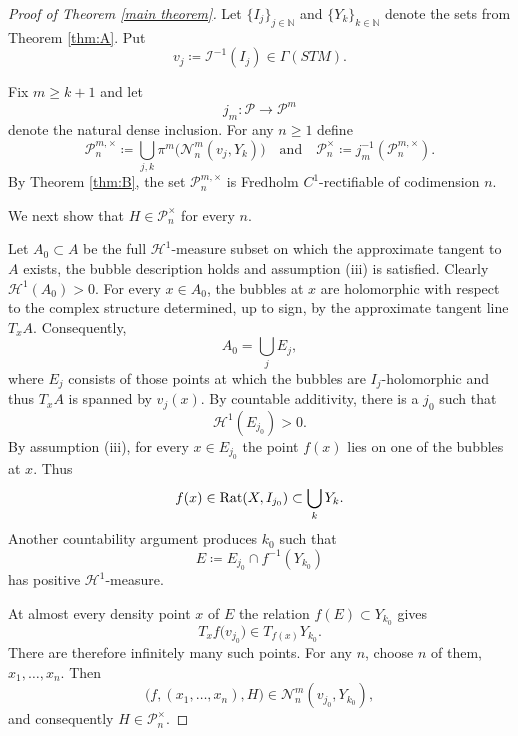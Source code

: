 \documentclass[11pt,a4paper]{article}
\theoremstyle{definition}
\newcommand{\Rat}{\textnormal{Rat}}
\newcommand{\eand}{\quad \text{and} \quad}
\newcommand{\cH}{\mathcal{H}}
\newcommand{\cI}{\mathcal{I}}
\newcommand{\cP}{\mathcal{P}}
\newcommand{\cN}{\mathcal{N}}
\newcommand{\bN}{\mathbb{N}}
\begin{document}
\begin{proof}[Proof of Theorem \ref{main theorem}]

Let $\{ I_j \}_{j \in \bN}$ and $\{ Y_k \}_{k \in \bN}$ denote the sets from Theorem \ref{thm:A}. Put 
\begin{equation*}
    v_j \coloneq \cI^{-1}(I_j) \in \Gamma(STM).
\end{equation*} 

Fix $m \geq k+1$ and let
\begin{equation*}
    j_m: \cP \to \cP^m
\end{equation*}
denote the natural dense inclusion. For any $n \geq 1$ define 
\begin{equation*}
    \cP^{m, \times}_n \coloneq \bigcup_{j,k} \pi^m\big(\cN^m_n (v_j, Y_k) \big) \eand \cP^\times_n \coloneq j^{-1}_m (\cP^{m, \times}_n ).
\end{equation*} 
By Theorem \ref{thm:B}, the set $\cP^{m, \times}_n$ is Fredholm $C^1$-rectifiable of codimension $n$.

We next show that $H \in \cP^\times_n$ for every $n$.

Let $A_0 \subset A$ be the full $\cH^1$-measure subset on which the approximate tangent to $A$ exists, the bubble description holds and assumption (iii) is satisfied. Clearly $\cH^1(A_0)>0$. For every $x \in A_0$, the bubbles at $x$ are holomorphic with respect to the complex structure determined, up to sign, by the approximate tangent line $T_x A$. Consequently,
\begin{equation*}
    A_0 = \bigcup_j E_j,
\end{equation*}
where $E_j$ consists of those points at which the bubbles are $I_j$-holomorphic and thus $T_x A$ is spanned by $v_j(x)$. By countable additivity, there is a $j_0$ such that 
\begin{equation*}
    \cH^1(E_{j_0}) >0.
\end{equation*}
By assumption (iii), for every $x \in E_{j_0}$ the point $f(x)$ lies on one of the bubbles at $x$. Thus 
\begin{equation*}
    f(x) \in \Rat(X, I_{j_0}) \subset \bigcup_k Y_k.
\end{equation*}
Another countability argument produces $k_0$ such that
\begin{equation*}
    E \coloneq E_{j_0} \cap f^{-1}(Y_{k_0})
\end{equation*}
has positive $\cH^1$-measure. 

At almost every density point $x$ of $E$ the relation $f(E) \subset Y_{k_0}$ gives
\begin{equation*}
    T_x f \big( v_{j_0}\big) \in T_{f(x)}Y_{k_0}.
\end{equation*}
There are therefore infinitely many such points. For any $n$, choose $n$ of them, $x_1, \dots, x_n$. Then
\begin{equation*}
    \big(f, (x_1, \dots, x_n), H \big) \in \cN^m_n(v_{j_0}, Y_{k_0}),
\end{equation*}
and consequently $H \in \cP^\times_n$.


\end{proof}
\end{document}
